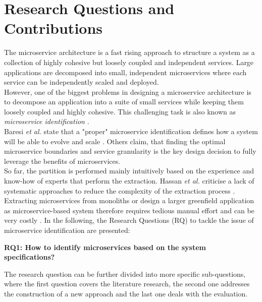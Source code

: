 \section{Research Questions and Contributions}
\label{sec:Introduction:ResearchQuestions}
The microservice architecture is a fast rising approach to structure a system as a collection of highly cohesive but loosely coupled and independent services. Large applications are decomposed into small, independent microservices where each service can be independently scaled and deployed. 
\\
However, one of the biggest problems in designing a microservice architecture is to decompose an application into a suite of small services while keeping them loosely coupled and highly cohesive. This challenging task is also known as \textit{microservice identification} \cite{ObjectAwareAmiri}. \\
Baresi \textit{et al.} state that a "proper" microservice identification defines how a system will be able to evolve and scale \cite{interfaceAnalysisBaresi}. Others claim, that finding the optimal microservice boundaries \cite{ClassificationOfRefactoring} and service granularity  \cite{ArchitecturalMetaModelling} is the key design decision to fully leverage the benefits of microservices. 
\\
So far, the partition is performed mainly intuitively based on the experience and know-how of experts that perform the extraction. Hassan \textit{et al.} criticise a lack of systematic approaches to reduce the complexity of the extraction process \cite{ArchitecturalMetaModelling}. Extracting microservices from monoliths or design a larger greenfield application as microservice-based system therefore requires tedious manual effort and can be very costly \cite{FunctionalDecompositionHeinrich} \cite{ExtractionMazlami}. In the following, the Research Questions (RQ) to tackle the issue of microservice identification are presented:


\vspace{0.5cm}
\par
\begingroup
\leftskip=1cm
\rightskip=1cm

\noindent
\textbf{RQ1: How to identify microservices based on the system specifications?}

\vspace{0.2cm}
\noindent
The research question can be further divided into more specific sub-questions, where the first question covers the literature research, the second one addresses the construction of a new approach and the last one deals with the evaluation.

